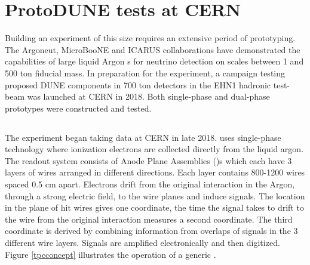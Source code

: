 \section{ProtoDUNE tests at CERN}

Building an experiment of this size requires an extensive period of prototyping.   The Argoneut\cite{Acciarri:2018myr}, MicroBooNE\cite{microboone} and ICARUS\cite{icarus} collaborations have demonstrated the capabilities of large liquid Argon s for neutrino detection on scales between 1 and 500 ton fiducial mass.  In preparation for the  experiment, a campaign testing proposed DUNE components in 700 ton detectors in the EHN1 hadronic test-beam was launched at CERN in 2018.  Both single-phase and dual-phase prototypes were constructed and tested. %

\subsection{}
The  experiment began taking data at CERN in late 2018.   uses single-phase technology where ionization electrons are collected directly from the liquid argon. The readout system consists of  Anode Plane Assemblies ()s which each have 3 layers of wires arranged in different directions. Each layer contains 800-1200  wires spaced 0.5 cm apart. Electrons drift from the original interaction in the Argon, through a strong electric field, to the wire planes and induce signals.  The location in the plane of hit wires gives one coordinate, the time the signal takes to drift to the wire from the original interaction measures a second coordinate.  The third coordinate is derived by combining information from overlaps of signals in the 3 different wire layers.  Signals are amplified electronically and then digitized.  Figure \ref{tpcconcept} illustrates the operation of a generic .

